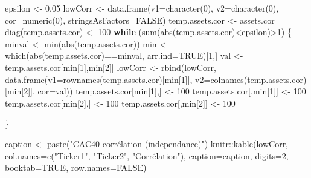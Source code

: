 \documentclass[
]{article}
\newenvironment{Shaded}{\begin{snugshade}}{\end{snugshade}}
\newcommand{\AttributeTok}[1]{\textcolor[rgb]{0.77,0.63,0.00}{#1}}
\newcommand{\ConstantTok}[1]{\textcolor[rgb]{0.00,0.00,0.00}{#1}}
\newcommand{\ControlFlowTok}[1]{\textcolor[rgb]{0.13,0.29,0.53}{\textbf{#1}}}
\newcommand{\DecValTok}[1]{\textcolor[rgb]{0.00,0.00,0.81}{#1}}
\newcommand{\FloatTok}[1]{\textcolor[rgb]{0.00,0.00,0.81}{#1}}
\newcommand{\FunctionTok}[1]{\textcolor[rgb]{0.00,0.00,0.00}{#1}}
\newcommand{\NormalTok}[1]{#1}
\newcommand{\OtherTok}[1]{\textcolor[rgb]{0.56,0.35,0.01}{#1}}
\newcommand{\SpecialCharTok}[1]{\textcolor[rgb]{0.00,0.00,0.00}{#1}}
\newcommand{\StringTok}[1]{\textcolor[rgb]{0.31,0.60,0.02}{#1}}
\begin{document}
\begin{Shaded}
\begin{Highlighting}[]
\NormalTok{epsilon }\OtherTok{\textless{}{-}} \FloatTok{0.05}
\NormalTok{lowCorr }\OtherTok{\textless{}{-}} \FunctionTok{data.frame}\NormalTok{(}\AttributeTok{v1=}\FunctionTok{character}\NormalTok{(}\DecValTok{0}\NormalTok{), }\AttributeTok{v2=}\FunctionTok{character}\NormalTok{(}\DecValTok{0}\NormalTok{), }\AttributeTok{cor=}\FunctionTok{numeric}\NormalTok{(}\DecValTok{0}\NormalTok{), }
                      \AttributeTok{stringsAsFactors=}\ConstantTok{FALSE}\NormalTok{)}
\NormalTok{temp.assets.cor }\OtherTok{\textless{}{-}}\NormalTok{ assets.cor}
\FunctionTok{diag}\NormalTok{(temp.assets.cor) }\OtherTok{\textless{}{-}} \DecValTok{100}
\ControlFlowTok{while}\NormalTok{ (}\FunctionTok{sum}\NormalTok{(}\FunctionTok{abs}\NormalTok{(temp.assets.cor)}\SpecialCharTok{\textless{}}\NormalTok{epsilon)}\SpecialCharTok{\textgreater{}}\DecValTok{1}\NormalTok{) \{}
\NormalTok{  minval }\OtherTok{\textless{}{-}} \FunctionTok{min}\NormalTok{(}\FunctionTok{abs}\NormalTok{(temp.assets.cor))}
\NormalTok{  min }\OtherTok{\textless{}{-}} \FunctionTok{which}\NormalTok{(}\FunctionTok{abs}\NormalTok{(temp.assets.cor)}\SpecialCharTok{==}\NormalTok{minval, }\AttributeTok{arr.ind=}\ConstantTok{TRUE}\NormalTok{)[}\DecValTok{1}\NormalTok{,]}
\NormalTok{  val }\OtherTok{\textless{}{-}}\NormalTok{ temp.assets.cor[min[}\DecValTok{1}\NormalTok{],min[}\DecValTok{2}\NormalTok{]]}
\NormalTok{  lowCorr }\OtherTok{\textless{}{-}} \FunctionTok{rbind}\NormalTok{(lowCorr, }\FunctionTok{data.frame}\NormalTok{(}\AttributeTok{v1=}\FunctionTok{rownames}\NormalTok{(temp.assets.cor)[min[}\DecValTok{1}\NormalTok{]], }
                                       \AttributeTok{v2=}\FunctionTok{colnames}\NormalTok{(temp.assets.cor)[min[}\DecValTok{2}\NormalTok{]], }
                                       \AttributeTok{cor=}\NormalTok{val))}
\NormalTok{  temp.assets.cor[min[}\DecValTok{1}\NormalTok{],] }\OtherTok{\textless{}{-}} \DecValTok{100}
\NormalTok{  temp.assets.cor[,min[}\DecValTok{1}\NormalTok{]] }\OtherTok{\textless{}{-}} \DecValTok{100}
\NormalTok{  temp.assets.cor[min[}\DecValTok{2}\NormalTok{],] }\OtherTok{\textless{}{-}} \DecValTok{100}
\NormalTok{  temp.assets.cor[,min[}\DecValTok{2}\NormalTok{]] }\OtherTok{\textless{}{-}} \DecValTok{100}

\NormalTok{\}}

\NormalTok{caption }\OtherTok{\textless{}{-}} \FunctionTok{paste}\NormalTok{(}\StringTok{"CAC40 corrélation (independance)"}\NormalTok{)}
\NormalTok{knitr}\SpecialCharTok{::}\FunctionTok{kable}\NormalTok{(lowCorr,}
             \AttributeTok{col.names=}\FunctionTok{c}\NormalTok{(}\StringTok{"Ticker1"}\NormalTok{, }\StringTok{"Ticker2"}\NormalTok{, }\StringTok{"Corrélation"}\NormalTok{), }
             \AttributeTok{caption=}\NormalTok{caption,}
             \AttributeTok{digits=}\DecValTok{2}\NormalTok{, }\AttributeTok{booktab=}\ConstantTok{TRUE}\NormalTok{, }\AttributeTok{row.names=}\ConstantTok{FALSE}\NormalTok{)}
\end{Highlighting}
\end{Shaded}
\end{document}
